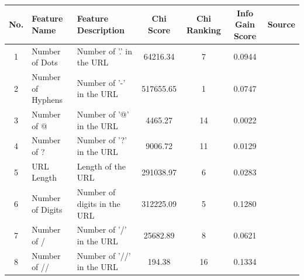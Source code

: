 \documentclass{article}
\begin{document}
    \begin{table}[H]
        \centering
        \begin{tabular}{|c|l|p{6cm}|c|c|c|l|}
            \hline
            \textbf{No.} & \textbf{Feature Name}           & \textbf{Feature Description}                   & \textbf{Chi Score} & \textbf{Chi Ranking} & \textbf{Info Gain Score} & \textbf{Source} \\ \hline
            1            & Number of Dots                  & Number of '.' in the URL                       & 64216.34           & 7                    & 0.0944                   & \cite{LexicalFeatureSelection}                  \\ \hline
            2            & Number of Hyphens               & Number of '-' in the URL                       & 517655.65          & 1                    & 0.0747                   & \cite{PhishSafe} \cite{LexicalFeatureSelection} \\ \hline
            3            & Number of @                     & Number of '@' in the URL                       & 4465.27            & 14                   & 0.0022                   & \cite{PhishSafe} \cite{LexicalFeatureSelection} \\ \hline
            4            & Number of ?                     & Number of '?' in the URL                       & 9006.72            & 11                   & 0.0129                   & \cite{LexicalFeatureSelection}                  \\ \hline
            5            & URL Length                      & Length of the URL                              & 291038.97          & 6                    & 0.0283                   & \cite{PhishSafe} \cite{LexicalFeatureSelection} \\ \hline
            6            & Number of Digits                & Number of digits in the URL                    & 312225.09          & 5                    & 0.1280                   &                                                 \\ \hline
            7            & Number of /                     & Number of '/' in the URL                       & 25682.89           & 8                    & 0.0621                   & \cite{LexicalFeatureSelection}                  \\ \hline
            8            & Number of //                    & Number of '//' in the URL                      & 194.38             & 16                   & 0.1334                   & \cite{PhishSafe} \cite{LexicalFeatureSelection} \\ \hline

\end{tabular}
\end{table}
\end{document}
